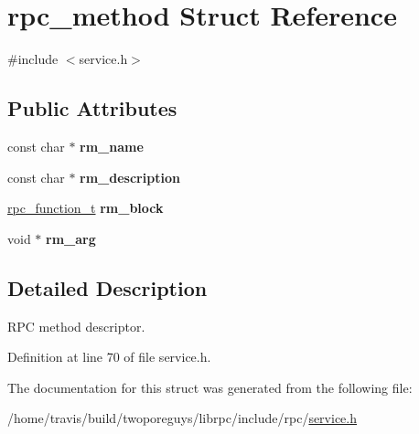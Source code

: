 \hypertarget{structrpc__method}{\section{rpc\-\_\-method Struct Reference}
\label{structrpc__method}
}


{\ttfamily \#include $<$service.\-h$>$}

\subsection*{Public Attributes}
\begin{DoxyCompactItemize}
\item 
\hypertarget{structrpc__method_abeff7db58d8903e9e6827d4acac7a8a0}{const char $\ast$ {\bfseries rm\-\_\-name}}\label{structrpc__method_abeff7db58d8903e9e6827d4acac7a8a0}

\item 
\hypertarget{structrpc__method_ab384c866584326d2e06c04ce1972a65a}{const char $\ast$ {\bfseries rm\-\_\-description}}\label{structrpc__method_ab384c866584326d2e06c04ce1972a65a}

\item 
\hypertarget{structrpc__method_ad6f2db7ebb8d4747730d4cb25b0c6824}{\hyperlink{service_8h_aacbe55ace3fb9f574028b8d4ed28bb70}{rpc\-\_\-function\-\_\-t} {\bfseries rm\-\_\-block}}\label{structrpc__method_ad6f2db7ebb8d4747730d4cb25b0c6824}

\item 
\hypertarget{structrpc__method_afc4708084618f0879e54efda3292cf8c}{void $\ast$ {\bfseries rm\-\_\-arg}}\label{structrpc__method_afc4708084618f0879e54efda3292cf8c}

\end{DoxyCompactItemize}


\subsection{Detailed Description}
R\-P\-C method descriptor. 

Definition at line 70 of file service.\-h.



The documentation for this struct was generated from the following file\-:\begin{DoxyCompactItemize}
\item 
/home/travis/build/twoporeguys/librpc/include/rpc/\hyperlink{service_8h}{service.\-h}\end{DoxyCompactItemize}
